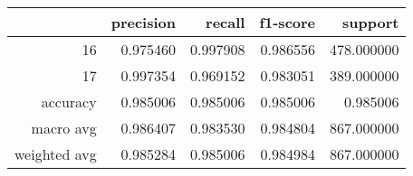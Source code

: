 \begin{tabular}{rrrrr}
\toprule
 & precision & recall & f1-score & support \\
\midrule
16 & 0.975460 & 0.997908 & 0.986556 & 478.000000 \\
17 & 0.997354 & 0.969152 & 0.983051 & 389.000000 \\
accuracy & 0.985006 & 0.985006 & 0.985006 & 0.985006 \\
macro avg & 0.986407 & 0.983530 & 0.984804 & 867.000000 \\
weighted avg & 0.985284 & 0.985006 & 0.984984 & 867.000000 \\
\bottomrule
\end{tabular}
